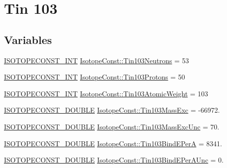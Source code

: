 \hypertarget{group___isotope_const-_tin-_sn103}{}\section{Tin 103}
\label{group___isotope_const-_tin-_sn103}
\subsection*{Variables}
\begin{DoxyCompactItemize}
\item 
\mbox{\hyperlink{group___isotope_const-_macros_ga5f18360b3e99483a35c32d789e62621c}{I\+S\+O\+T\+O\+P\+E\+C\+O\+N\+S\+T\+\_\+\+I\+NT}} \mbox{\hyperlink{group___isotope_const-_tin-_sn103_gaacd4dea61292dfc213a42e68abfa3389}{Isotope\+Const\+::\+Tin103\+Neutrons}} = 53
\item 
\mbox{\hyperlink{group___isotope_const-_macros_ga5f18360b3e99483a35c32d789e62621c}{I\+S\+O\+T\+O\+P\+E\+C\+O\+N\+S\+T\+\_\+\+I\+NT}} \mbox{\hyperlink{group___isotope_const-_tin-_sn103_ga5c41c9ec8efde592937ea1589dbd4760}{Isotope\+Const\+::\+Tin103\+Protons}} = 50
\item 
\mbox{\hyperlink{group___isotope_const-_macros_ga5f18360b3e99483a35c32d789e62621c}{I\+S\+O\+T\+O\+P\+E\+C\+O\+N\+S\+T\+\_\+\+I\+NT}} \mbox{\hyperlink{group___isotope_const-_tin-_sn103_ga50eb24257ab7dbe660ce88a19f924828}{Isotope\+Const\+::\+Tin103\+Atomic\+Weight}} = 103
\item 
\mbox{\hyperlink{group___isotope_const-_macros_ga8f45a7272ce02c0b4c65c44636ed719a}{I\+S\+O\+T\+O\+P\+E\+C\+O\+N\+S\+T\+\_\+\+D\+O\+U\+B\+LE}} \mbox{\hyperlink{group___isotope_const-_tin-_sn103_ga49bf72fb2282c5f40c7c6f8e5d2f1bd6}{Isotope\+Const\+::\+Tin103\+Mass\+Exc}} = -\/66972.
\item 
\mbox{\hyperlink{group___isotope_const-_macros_ga8f45a7272ce02c0b4c65c44636ed719a}{I\+S\+O\+T\+O\+P\+E\+C\+O\+N\+S\+T\+\_\+\+D\+O\+U\+B\+LE}} \mbox{\hyperlink{group___isotope_const-_tin-_sn103_ga7caf74a02003183f7bd02e1d73ce756d}{Isotope\+Const\+::\+Tin103\+Mass\+Exc\+Unc}} = 70.
\item 
\mbox{\hyperlink{group___isotope_const-_macros_ga8f45a7272ce02c0b4c65c44636ed719a}{I\+S\+O\+T\+O\+P\+E\+C\+O\+N\+S\+T\+\_\+\+D\+O\+U\+B\+LE}} \mbox{\hyperlink{group___isotope_const-_tin-_sn103_gac93d327ca57c9f04fdf5fac7bff22ada}{Isotope\+Const\+::\+Tin103\+Bind\+E\+PerA}} = 8341.
\item 
\mbox{\hyperlink{group___isotope_const-_macros_ga8f45a7272ce02c0b4c65c44636ed719a}{I\+S\+O\+T\+O\+P\+E\+C\+O\+N\+S\+T\+\_\+\+D\+O\+U\+B\+LE}} \mbox{\hyperlink{group___isotope_const-_tin-_sn103_ga4ad36eca8694023076cd251e40b76de3}{Isotope\+Const\+::\+Tin103\+Bind\+E\+Per\+A\+Unc}} = 0.

\end{DoxyCompactItemize}
